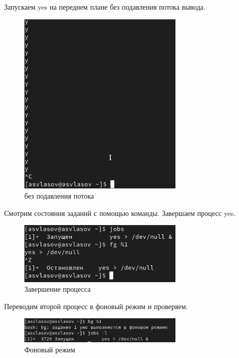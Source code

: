 \documentclass[
  12pt,
  a4paper,
  DIV=11,
  numbers=noendperiod]{scrreprt}
\begin{document}
Запускаем yes на переднем плане без подавления потока вывода.

\begin{figure}

{\centering \includegraphics[width=0.7\textwidth,height=\textheight]{image/9.png}

}

\caption{без подавления потока}

\end{figure}%

Смотрим состояния заданий с помощью команды. Завершаем процесс yes.

\begin{figure}

{\centering \includegraphics[width=0.7\textwidth,height=\textheight]{image/10.png}

}

\caption{Завершение процесса}

\end{figure}%

Переводим второй процесс в фоновый режим и проверяем.

\begin{figure}

{\centering \includegraphics[width=0.7\textwidth,height=\textheight]{image/11.png}

}

\caption{Фоновый режим}

\end{figure}%
\end{document}
